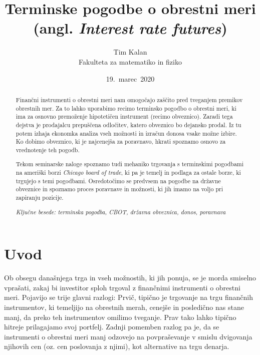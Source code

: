 \documentclass[a4paper, 11pt]{article}
\author{Tim Kalan \\ Fakulteta za matematiko in fiziko}
\title{
    Terminske pogodbe o obrestni meri \\ 
    \large (angl. \textit{Interest rate futures})}
\date{19.\ marec\ 2020} %
\begin{document}
\begin{titlepage}
    \maketitle
    \thispagestyle{empty}
\end{titlepage}

\pagebreak

\begin{abstract}
    Finančni instrumenti o obrestni meri nam omogočajo zaščito pred tveganjem premikov obrestnih mer. Za to 
    lahko uporabimo recimo terminsko pogodbo o obrestni meri, ki ima za osnovno premoženje hipotetičen
    instrument (recimo obveznico). Zaradi tega dejstva je prodajalcu prepuščena odločitev, katero 
    obveznico bo dejansko prodal. Iz tu potem izhaja ekonomka analiza vseh možnosti in izračun donosa
    vsake možne izbire. Ko dobimo obveznico, ki je najcenejša za poravnavo, hkrati spoznamo osnovo za 
    vrednotenje teh pogodb. 

    Tekom seminarske naloge spoznamo tudi mehaniko trgovanja s terminskimi pogodbami na ameriški borzi 
    \textit{Chicago board of trade}, ki pa je temelj in podlaga za ostale borze, ki trgujejo s temi pogodbami. 
    Osredotočimo se predvsem na pogodbe na državne obveznice in spoznamo proces poravnave in možnosti, ki jih 
    imamo na voljo pri zapiranju pozicije.

    \textit{Ključne besede: terminska pogodba, CBOT, državna obveznica, donos, poravnava}
    

\end{abstract}

\pagebreak

\tableofcontents

\pagebreak

\section{Uvod}
Ob obsegu današnjega trga in vseh možnostih, ki jih ponuja, se je morda smiselno vprašati,
zakaj bi investitor sploh trgoval z finančnimi instrumenti o obrestni meri. Pojavijo se trije
glavni razlogi: Prvič, tipično je trgovanje na trgu finančnih instrumentov, ki temeljijo na 
obrestnih merah, cenejše in posledično nas stane manj, da preko teh instrumentov omilimo 
tveganje. Prav tako lahko tipično hitreje prilagajamo svoj portfelj. Zadnji pomemben razlog 
pa je, da se instrumenti o obrestni meri manj odzovejo na povpraševanje v smislu dvigovanja 
njihovih cen (oz. cen poslovanja z njimi), kot alternative na trgu denarja.
\end{document}
